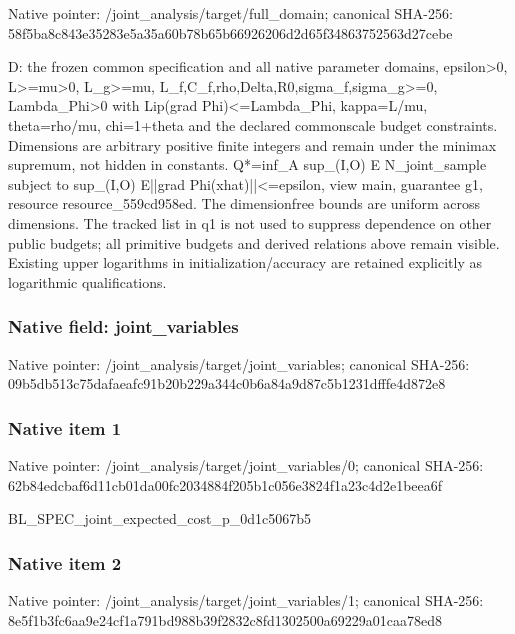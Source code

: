 \documentclass[10pt,a4paper]{article}
\begin{document}
Native pointer: /joint\_analysis/target/full\_domain; canonical SHA-256: 58f5ba8c843e35283e5a35a6\allowbreak{}0b78b65b66926206d2d65f34\allowbreak{}863752563d27cebe


D: the frozen common specification and all native parameter domains, epsilon>0, L>=mu>0, L\_g>=mu, L\_f,C\_f,rho,Delta,R0,sig\allowbreak{}ma\_f,sigma\_g>=0, Lambda\_Phi>0 with Lip(grad Phi)<=Lambda\_Phi, kappa=L/mu, theta=rho/mu, chi=1+theta and the declared commonscale budget constraints. Dimensions are arbitrary positive finite integers and remain under the minimax supremum, not hidden in constants. Q*=inf\_A sup\_(I,O) E N\_joint\_sample subject to sup\_(I,O) E||grad Phi(xhat)||<=epsilon, view main, guarantee g1, resource resource\_559cd958ed. The dimensionfree bounds are uniform across dimensions. The tracked list in q1 is not used to suppress dependence on other public budgets; all primitive budgets and derived relations above remain visible. Existing upper logarithms in initialization/accuracy are retained explicitly as logarithmic qualifications.


\subsubsection{Native field: joint\_variables}


Native pointer: /joint\_analysis/target/joint\_variables; canonical SHA-256: 09b5db513c75dafaeafc91b2\allowbreak{}0b229a344c0b6a84a9d87c5b\allowbreak{}1231dfffe4d872e8



\subsubsection{Native item 1}


Native pointer: /joint\_analysis/target/j\allowbreak{}oint\_variables/0; canonical SHA-256: 62b84edcbaf6d11cb01da00f\allowbreak{}c2034884f205b1c056e3824f\allowbreak{}1a23c4d2e1beea6f


BL\_SPEC\_joint\_expected\_c\allowbreak{}ost\_p\_0d1c5067b5


\subsubsection{Native item 2}


Native pointer: /joint\_analysis/target/j\allowbreak{}oint\_variables/1; canonical SHA-256: 8e5f1b3fc6aa9e24cf1a791b\allowbreak{}d988b39f2832c8fd1302500a\allowbreak{}69229a01caa78ed8
\end{document}

